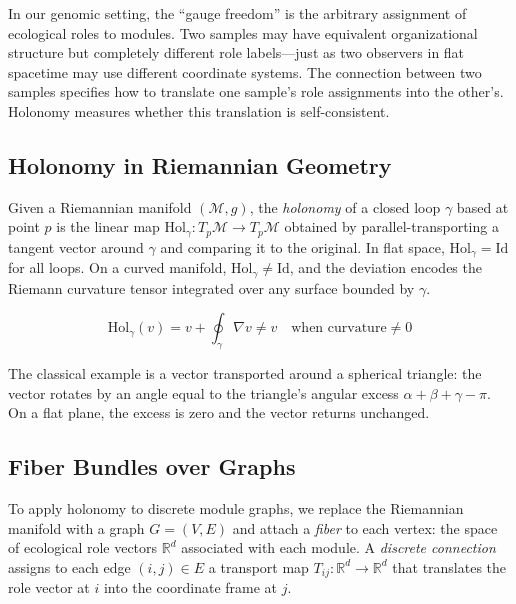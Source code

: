 \documentclass{../yalumba}
\begin{document}
In our genomic setting, the ``gauge freedom'' is the arbitrary assignment of
ecological roles to modules.  Two samples may have equivalent organizational
structure but completely different role labels---just as two observers in
flat spacetime may use different coordinate systems.  The connection between
two samples specifies how to translate one sample's role assignments into
the other's.  Holonomy measures whether this translation is self-consistent.

\subsection{Holonomy in Riemannian Geometry}

Given a Riemannian manifold $(\mathcal{M}, g)$, the \emph{holonomy} of a
closed loop $\gamma$ based at point $p$ is the linear map
$\text{Hol}_\gamma: T_p\mathcal{M} \to T_p\mathcal{M}$ obtained by
parallel-transporting a tangent vector around $\gamma$ and comparing it to
the original.  In flat space, $\text{Hol}_\gamma = \text{Id}$ for all loops.
On a curved manifold, $\text{Hol}_\gamma \neq \text{Id}$, and the deviation
encodes the Riemann curvature tensor integrated over any surface bounded by
$\gamma$.

\begin{equation}
  \text{Hol}_\gamma(v) = v + \oint_\gamma \nabla v \neq v
  \quad\text{when curvature} \neq 0
  \label{eq:holonomy-continuous}
\end{equation}


The classical example is a vector transported around a spherical triangle:
the vector rotates by an angle equal to the triangle's angular excess
$\alpha + \beta + \gamma - \pi$.  On a flat plane, the excess is zero and
the vector returns unchanged.

\subsection{Fiber Bundles over Graphs}

To apply holonomy to discrete module graphs, we replace the Riemannian
manifold with a graph $G = (V, E)$ and attach a \emph{fiber} to each
vertex: the space of ecological role vectors $\mathbb{R}^d$ associated
with each module.  A \emph{discrete connection} assigns to each edge
$(i, j) \in E$ a transport map $T_{ij}: \mathbb{R}^d \to \mathbb{R}^d$
that translates the role vector at $i$ into the coordinate frame at $j$.
\end{document}
